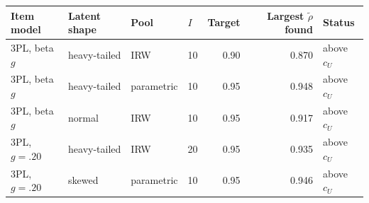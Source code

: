 \setlength{\tabcolsep}{4pt}
\begin{tabular}{llllrrl}
\hline
Item model & Latent shape & Pool & $I$ & Target & Largest $\tilde\rho$ found & Status \\
\hline
3PL, beta $g$ & heavy-tailed & IRW & 10 & 0.90 & 0.870 & above $c_U$ \\
3PL, beta $g$ & heavy-tailed & parametric & 10 & 0.95 & 0.948 & above $c_U$ \\
3PL, beta $g$ & normal & IRW & 10 & 0.95 & 0.917 & above $c_U$ \\
3PL, $g=.20$ & heavy-tailed & IRW & 20 & 0.95 & 0.935 & above $c_U$ \\
3PL, $g=.20$ & skewed & parametric & 10 & 0.95 & 0.946 & above $c_U$ \\
\hline
\end{tabular}
